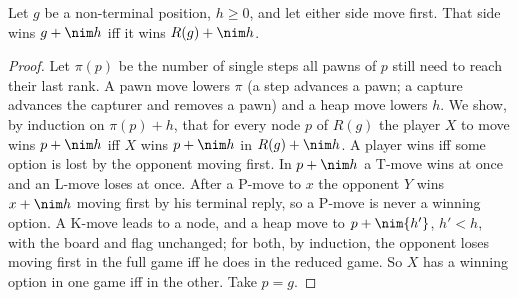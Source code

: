 \begin{wlemma}
Let $g$ be a non-terminal position, $h\ge0$, and let either side move first. That side wins $g+\nim h$ iff it wins $R(g)+\nim h$.
\end{wlemma}
\begin{proof}
Let $\pi(p)$ be the number of single steps all pawns of $p$ still need to reach their last rank. A pawn move lowers $\pi$ (a step
advances a pawn; a capture advances the capturer and removes a pawn) and a heap move lowers $h$. We show, by induction on
$\pi(p)+h$, that for every node $p$ of $R(g)$ the player $X$ to move wins $p+\nim h$ iff $X$ wins $p+\nim h$ in $R(g)+\nim h$. A player wins iff
some option is lost by the opponent moving first. In $p+\nim h$ a T-move wins at once and an L-move loses at once. After a P-move to $x$
the opponent $Y$ wins $x+\nim h$ moving first by his terminal reply, so a P-move is never a winning option. A K-move leads to a node, and a
heap move to $p+\nim{h'}$, $h'<h$, with the board and flag unchanged; for both, by induction, the opponent loses moving first in the full
game iff he does in the reduced game. So $X$ has a winning option in one game iff in the other. Take $p=g$.
\end{proof}


